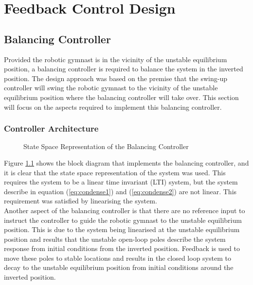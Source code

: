 \chapter{Feedback Control Design}
\label{chp:controller}

\section{Balancing Controller}

Provided the robotic gymnast is in the vicinity of the unstable equilibrium position, a balancing controller is required to balance the system in the inverted position. The design approach was based on the premise that the swing-up controller will swing the robotic gymnast to the vicinity of the unstable equilibrium position where the balancing controller will take over. This section will focus on the aspects required to implement this balancing controller.\\


\subsection{Controller Architecture}
\begin{figure}
	\centering
	
	\caption{State Space Representation of the Balancing Controller}
	\label{fig:linearSys2}
\end{figure}

Figure \ref{fig:linearSys2} shows the block diagram that implements the balancing controller, and it is clear that the state space representation of the system was used. This requires the system to be a linear time invariant (LTI) system, but the system describe in equation (\ref{eq:condense1}) and (\ref{eq:condense2}) are not linear. This requirement was satisfied by linearising the system.\\

Another aspect of the balancing controller is that there are no reference input to instruct the controller to guide the robotic gymnast to the unstable equilibrium position. This is due to the system being linearised at the unstable equilibrium position and results that the unstable open-loop poles describe the system response from initial conditions from the inverted position.  Feedback is used to move these poles to stable locations and results in the closed loop system to decay to the unstable equilibrium position from initial conditions around the inverted position.


